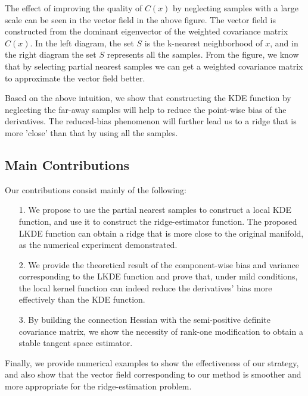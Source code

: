 \documentclass[aos,preprint]{imsart}
\theoremstyle{remark}
\begin{document}
The effect of improving the quality of $C(x)$ by neglecting samples with a large scale can be seen in the vector field in the above figure. The vector field is constructed from the dominant eigenvector of the weighted covariance matrix $C(x)$. In the left diagram, the set $S$ is the k-nearest neighborhood of $x$, and in the right diagram the set $S$ represents all the samples. From the figure, we know that by selecting partial nearest samples we can get a weighted covariance matrix to approximate the vector field better.

Based on the above intuition, we show that constructing the KDE function by neglecting the far-away samples will help to reduce the point-wise bias of the derivatives. The reduced-bias phenomenon will further lead us to a ridge that is more 'close' than that by using all the samples.
 \subsection{Main Contributions}
Our contributions consist mainly of the following:
\begin{itemize}
\item[1.] We propose to use the partial nearest samples to construct a local KDE function, and use it to construct the ridge-estimator function. The proposed LKDE function can obtain a ridge that is more close to the original manifold, as the numerical experiment demonstrated.
\item[2.] We provide the theoretical result of the component-wise bias and variance corresponding to the LKDE function and prove that, under mild conditions, the local kernel function can indeed reduce the derivatives' bias more effectively than the KDE function.
\item[3.] By building the connection Hessian with the semi-positive definite covariance matrix, we show the necessity of rank-one modification to obtain a stable tangent space estimator.
\end{itemize}
Finally, we provide numerical examples to show the effectiveness of our strategy, and also show that the vector field corresponding to our method is smoother and more appropriate for the ridge-estimation problem.
\end{document}
